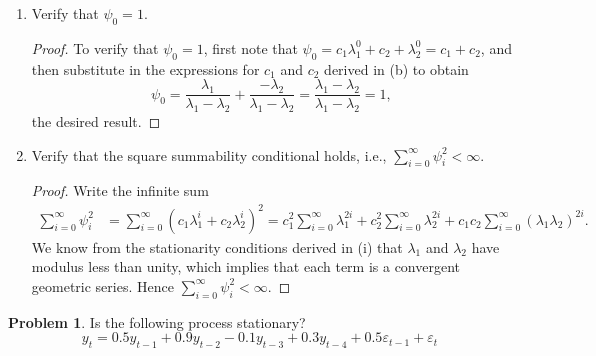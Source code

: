 \documentclass[oneside,reqno]{amsart}
\newcommand{\eps}{\varepsilon}
\theoremstyle{definition}
\newtheorem{prob}{Problem}
\begin{document}
\begin{enumerate}
\begin{proof}
\begin{align*}
	y_t &= \frac{\lambda_1}{\lambda_1 -\lambda_2}  \sum_{i=0}^\infty \lambda_1^i\eps_{t-i} + \frac{\lambda_2}{\lambda_2 -\lambda_1} \sum_{i=0}^\infty \lambda_2^i  \eps_{t-i} \\
	&= \sum_{i=0}^\infty \left(\frac{\lambda_1}{\lambda_1 -\lambda_2} \lambda_1^i +\frac{\lambda_2}{\lambda_2 -\lambda_1}\lambda_2^i \right) \eps_{t-i} \\
	&= \sum_{i=0}^\infty \left(c_1\lambda_1^i +c_2 \lambda_2^i \right) \eps_{t-i} = \sum_{i=0}^\infty \psi_i \eps_{t-i},
\end{align*}
where $\psi_i = c_1 \lambda_1^i + c_2 \lambda_2^i$, for  $i = 0,1,2,\dotsc$.
\end{proof}

\item
Verify that $\psi_0=1$.

\begin{proof}
To verify that $\psi_0=1$, first note that $\psi_0 = c_1 \lambda_1^0 + c_2 +\lambda_2^0 = c_1 + c_2$, and then substitute in the expressions for $c_1$ and $c_2$ derived in (b) to obtain
\[
	\psi_0 = \frac{\lambda_1}{\lambda_1 - \lambda_2} + \frac{-\lambda_2}{\lambda_1 - \lambda_2} = \frac{\lambda_1- \lambda_2}{\lambda_1 - \lambda_2} =1,
\]
the desired result.
\end{proof}

\item
Verify that the square summability conditional holds, i.e., $\sum_{i=0}^\infty \psi_i^2 < \infty$.

\begin{proof}
Write the infinite sum 
\begin{align*}
	\sum_{i=0}^\infty \psi_i^2 &= \sum_{i=0}^\infty \left(c_1\lambda_1^i +c_2 \lambda_2^i \right)^2 = c_1^2 \sum_{i=0}^\infty \lambda_1^{2i} + c_2^2 \sum_{i=0}^\infty \lambda_2^{2i} + c_1 c_2 \sum_{i=0}^\infty (\lambda_1\lambda_2)^{2i}.
\end{align*}
We know from the stationarity conditions derived in (i) that $\lambda_1$ and $\lambda_2$ have modulus less than unity, which implies that each term is a convergent geometric series. Hence $\sum_{i=0}^\infty \psi_i^2 < \infty$.
\end{proof}
\end{enumerate}

\begin{prob}
Is the following process stationary?
\begin{equation}\label{eq:q3-process}
	y_t = 0.5 y_{t-1} + 0.9 y_{t-2} - 0.1 y_{t-3} + 0.3 y_{t-4} + 0.5 \eps_{t-1} + \eps_t
\end{equation}
\end{prob}
\end{document}
